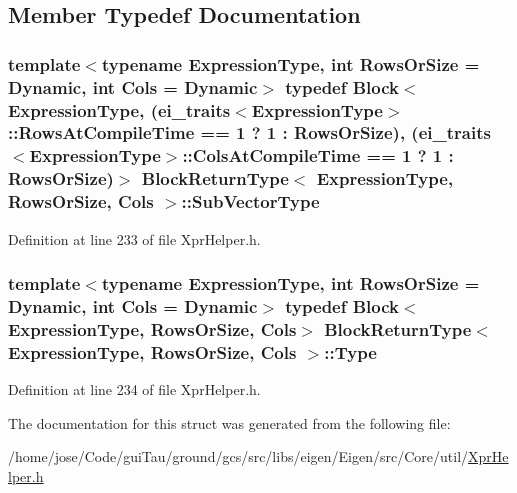 \subsection{Member Typedef Documentation}
\hypertarget{struct_block_return_type_a8f001915e686ce8786ae838da9210a50}{
\subsubsection[{Sub\-Vector\-Type}]{\setlength{\rightskip}{0pt plus 5cm}template$<$typename Expression\-Type, int Rows\-Or\-Size = Dynamic, int Cols = Dynamic$>$ typedef {\bf Block}$<$Expression\-Type, ({\bf ei\-\_\-traits}$<$Expression\-Type$>$\-::Rows\-At\-Compile\-Time == 1 ? 1 \-: Rows\-Or\-Size), ({\bf ei\-\_\-traits}$<$Expression\-Type$>$\-::Cols\-At\-Compile\-Time == 1 ? 1 \-: Rows\-Or\-Size)$>$ {\bf Block\-Return\-Type}$<$ Expression\-Type, Rows\-Or\-Size, Cols $>$\-::{\bf Sub\-Vector\-Type}}}\label{struct_block_return_type_a8f001915e686ce8786ae838da9210a50}


Definition at line 233 of file Xpr\-Helper.\-h.

\hypertarget{struct_block_return_type_add2965d23b04edf99213e92dc8753ae0}{
\subsubsection[{Type}]{\setlength{\rightskip}{0pt plus 5cm}template$<$typename Expression\-Type, int Rows\-Or\-Size = Dynamic, int Cols = Dynamic$>$ typedef {\bf Block}$<$Expression\-Type, Rows\-Or\-Size, Cols$>$ {\bf Block\-Return\-Type}$<$ Expression\-Type, Rows\-Or\-Size, Cols $>$\-::{\bf Type}}}\label{struct_block_return_type_add2965d23b04edf99213e92dc8753ae0}


Definition at line 234 of file Xpr\-Helper.\-h.



The documentation for this struct was generated from the following file\-:\begin{DoxyCompactItemize}
\item 
/home/jose/\-Code/gui\-Tau/ground/gcs/src/libs/eigen/\-Eigen/src/\-Core/util/\hyperlink{_xpr_helper_8h}{Xpr\-Helper.\-h}\end{DoxyCompactItemize}

